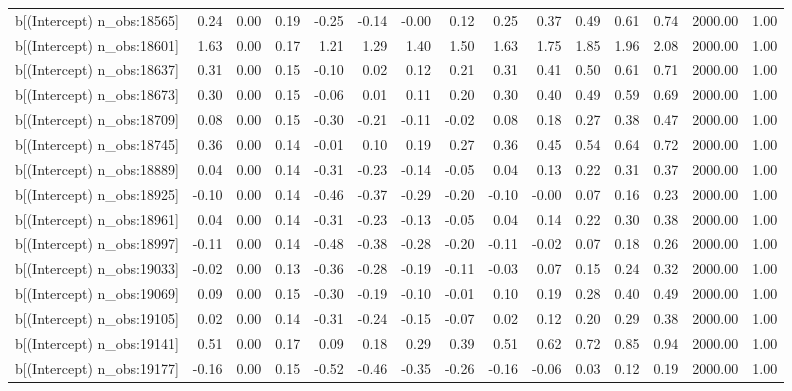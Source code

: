 \begin{table}[ht]
\begin{tabular}{rrrrrrrrrrrrrrr}
  b[(Intercept) n\_obs:18565] & 0.24 & 0.00 & 0.19 & -0.25 & -0.14 & -0.00 & 0.12 & 0.25 & 0.37 & 0.49 & 0.61 & 0.74 & 2000.00 & 1.00 \\ 
  b[(Intercept) n\_obs:18601] & 1.63 & 0.00 & 0.17 & 1.21 & 1.29 & 1.40 & 1.50 & 1.63 & 1.75 & 1.85 & 1.96 & 2.08 & 2000.00 & 1.00 \\ 
  b[(Intercept) n\_obs:18637] & 0.31 & 0.00 & 0.15 & -0.10 & 0.02 & 0.12 & 0.21 & 0.31 & 0.41 & 0.50 & 0.61 & 0.71 & 2000.00 & 1.00 \\ 
  b[(Intercept) n\_obs:18673] & 0.30 & 0.00 & 0.15 & -0.06 & 0.01 & 0.11 & 0.20 & 0.30 & 0.40 & 0.49 & 0.59 & 0.69 & 2000.00 & 1.00 \\ 
  b[(Intercept) n\_obs:18709] & 0.08 & 0.00 & 0.15 & -0.30 & -0.21 & -0.11 & -0.02 & 0.08 & 0.18 & 0.27 & 0.38 & 0.47 & 2000.00 & 1.00 \\ 
  b[(Intercept) n\_obs:18745] & 0.36 & 0.00 & 0.14 & -0.01 & 0.10 & 0.19 & 0.27 & 0.36 & 0.45 & 0.54 & 0.64 & 0.72 & 2000.00 & 1.00 \\ 
  b[(Intercept) n\_obs:18889] & 0.04 & 0.00 & 0.14 & -0.31 & -0.23 & -0.14 & -0.05 & 0.04 & 0.13 & 0.22 & 0.31 & 0.37 & 2000.00 & 1.00 \\ 
  b[(Intercept) n\_obs:18925] & -0.10 & 0.00 & 0.14 & -0.46 & -0.37 & -0.29 & -0.20 & -0.10 & -0.00 & 0.07 & 0.16 & 0.23 & 2000.00 & 1.00 \\ 
  b[(Intercept) n\_obs:18961] & 0.04 & 0.00 & 0.14 & -0.31 & -0.23 & -0.13 & -0.05 & 0.04 & 0.14 & 0.22 & 0.30 & 0.38 & 2000.00 & 1.00 \\ 
  b[(Intercept) n\_obs:18997] & -0.11 & 0.00 & 0.14 & -0.48 & -0.38 & -0.28 & -0.20 & -0.11 & -0.02 & 0.07 & 0.18 & 0.26 & 2000.00 & 1.00 \\ 
  b[(Intercept) n\_obs:19033] & -0.02 & 0.00 & 0.13 & -0.36 & -0.28 & -0.19 & -0.11 & -0.03 & 0.07 & 0.15 & 0.24 & 0.32 & 2000.00 & 1.00 \\ 
  b[(Intercept) n\_obs:19069] & 0.09 & 0.00 & 0.15 & -0.30 & -0.19 & -0.10 & -0.01 & 0.10 & 0.19 & 0.28 & 0.40 & 0.49 & 2000.00 & 1.00 \\ 
  b[(Intercept) n\_obs:19105] & 0.02 & 0.00 & 0.14 & -0.31 & -0.24 & -0.15 & -0.07 & 0.02 & 0.12 & 0.20 & 0.29 & 0.38 & 2000.00 & 1.00 \\ 
  b[(Intercept) n\_obs:19141] & 0.51 & 0.00 & 0.17 & 0.09 & 0.18 & 0.29 & 0.39 & 0.51 & 0.62 & 0.72 & 0.85 & 0.94 & 2000.00 & 1.00 \\ 
  b[(Intercept) n\_obs:19177] & -0.16 & 0.00 & 0.15 & -0.52 & -0.46 & -0.35 & -0.26 & -0.16 & -0.06 & 0.03 & 0.12 & 0.19 & 2000.00 & 1.00 \\ 

\end{tabular}
\end{table}

